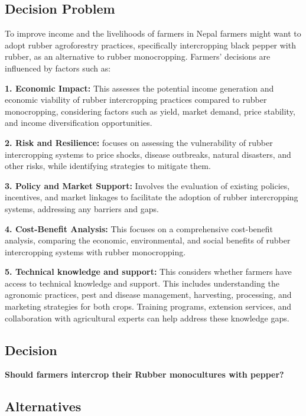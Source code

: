 \documentclass[
]{article}
\begin{document}
\hypertarget{decision-problem}{%
\subsection{Decision Problem}\label{decision-problem}}

To improve income and the livelihoods of farmers in Nepal farmers might want to adopt rubber agroforestry practices, specifically intercropping black pepper with rubber, as an alternative to rubber monocropping. Farmers' decisions are influenced by factors such as:

\textbf{1. Economic Impact:} This assesses the potential income generation and economic viability of rubber intercropping practices compared to rubber monocropping, considering factors such as yield, market demand, price stability, and income diversification opportunities.

\textbf{2. Risk and Resilience:} focuses on assessing the vulnerability of rubber intercropping systems to price shocks, disease outbreaks, natural disasters, and other risks, while identifying strategies to mitigate them.

\textbf{3. Policy and Market Support:} Involves the evaluation of existing policies, incentives, and market linkages to facilitate the adoption of rubber intercropping systems, addressing any barriers and gaps.

\textbf{4. Cost-Benefit Analysis:} This focuses on a comprehensive cost-benefit analysis, comparing the economic, environmental, and social benefits of rubber intercropping systems with rubber monocropping.

\textbf{5. Technical knowledge and support:} This considers whether farmers have access to technical knowledge and support. This includes understanding the agronomic practices, pest and disease management, harvesting, processing, and marketing strategies for both crops. Training programs, extension services, and collaboration with agricultural experts can help address these knowledge gaps.

\hypertarget{decision}{%
\subsection{Decision}\label{decision}}

\textbf{Should farmers intercrop their Rubber monocultures with pepper?}

\hypertarget{alternatives}{%
\subsection{Alternatives}\label{alternatives}}
\end{document}
